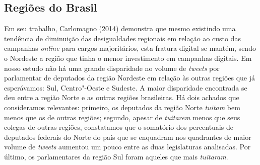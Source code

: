 
\subsection{Regiões do Brasil}

Em seu trabalho, Carlomagno (2014) demonstra que mesmo existindo uma
tendência de diminuição das desigualdades regionais em relação ao custo
das campanhas \textit{online} para cargos majoritários, esta fratura digital se
mantém, sendo o Nordeste a região que tinha o menor investimento em
campanhas digitais. Em nosso estudo não há uma grande disparidade no
volume de \textit{tweets} por parlamentar de deputados da região Nordeste
em relação às outras regiões que já esperávamos: Sul, Centro"-Oeste e
Sudeste. A maior disparidade encontrada se deu entre a região Norte e
as outras regiões brasileiras. Há dois achados que consideramos
relevantes: primeiro, os deputados da região Norte \textit{tuitam} bem
menos que os de outras regiões; segundo, apesar de \textit{tuitarem} menos
que seus colegas de outras regiões, constatamos que o somatório dos
percentuais de deputados federais do Norte do país que se enquadram nos
quadrantes de maior volume de \textit{tweets} aumentou um pouco entre as
duas legislaturas analisadas. Por último, os parlamentares da região Sul
foram aqueles que mais \textit{tuitaram}.

